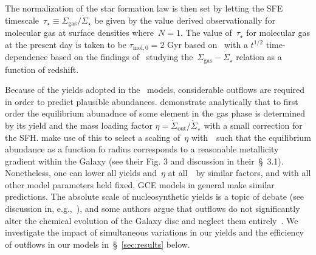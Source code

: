 \documentclass[ms.tex]{subfiles}
\begin{document}
The normalization of the star formation law is then set by letting the SFE
timescale~$\tau_\star \equiv \Sigma_\text{gas} / \dot{\Sigma}_\star$ be given
by the value derived observationally for molecular gas at surface densities
where~$N = 1$.
The value of~$\tau_\star$ for molecular gas at the present day is taken to be
$\tau_{\text{mol},0} = 2$ Gyr based on~\citet{Leroy2008, Leroy2013} with a
$t^{1/2}$ time-dependence based on the findings of~\citet{Tacconi2018} studying
the~$\Sigma_\text{gas} - \dot{\Sigma}_\star$ relation as a function of
redshift.
\par
Because of the yields adopted in the~\citet{Johnson2021} models, considerable
outflows are required in order to predict plausible abundances.
\citet{Weinberg2017} demonstrate analytically that to first order the
equilibrium abunadnce of some element in the gas phase is determined by its
yield and the mass loading factor
$\eta = \dot{\Sigma}_\text{out} / \dot{\Sigma}_\star$ with a small correction
for the SFH.
\citet{Johnson2021} make use of this to select a scaling of~$\eta$
with~\rgal~such that the equilibrium abundance as a function fo radius
corresponds to a reasonable metallicity gradient within the Galaxy (see their
Fig. 3 and discussion in their~\S~3.1).
Nonetheless, one can lower all yields and~$\eta$ at all~\rgal~by similar
factors, and with all other model parameters held fixed, GCE models in general
make similar predictions.
The absolute scale of nucleosynthetic yields is a topic of debate (see
discussion in, e.g.,~\citealp{Griffith2021}), and some authors argue that
outflows do not significantly alter the chemical evolution of the Galaxy disc
and neglect them entirely~\citep[e.g.][]{Spitoni2019, Spitoni2021}.
We investigate the impact of simultaneous variations in our yields and the
efficiency of outflows in our models in~\S~\ref{sec:results} below.
\end{document}
